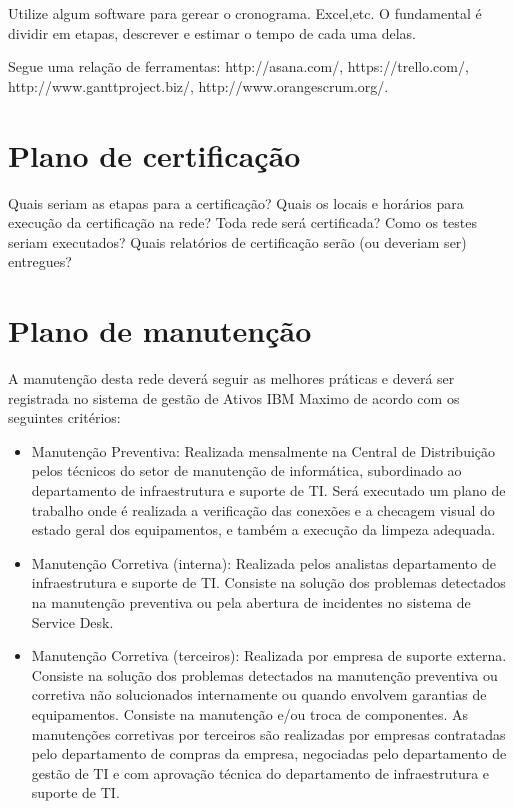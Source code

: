 \documentclass[	DIV=calc,%
							paper=a4,%
							fontsize=12pt,%
							onecolumn]{scrartcl}	 					%
\begin{document}
Utilize algum software para gerear o cronograma. Excel,etc. O fundamental é dividir em etapas, descrever e estimar o tempo de cada uma delas.

Segue uma relação de ferramentas:
http://asana.com/, 
https://trello.com/, 
http://www.ganttproject.biz/, 
http://www.orangescrum.org/. 

\section{Plano de certificação}
Quais seriam as etapas para a certificação? 
Quais os locais e horários para execução da certificação na rede? Toda rede será certificada?
Como os testes seriam executados?
Quais relatórios de certificação serão (ou deveriam ser) entregues? 

\section{Plano de manutenção}

A manutenção desta rede deverá seguir as melhores práticas e deverá ser registrada no sistema de gestão de Ativos IBM Maximo de acordo com os seguintes critérios: 
\begin{itemize}
	\item Manutenção Preventiva: Realizada mensalmente na Central de Distribuição pelos técnicos do setor de manutenção de informática, subordinado ao departamento de infraestrutura e suporte de TI. Será executado um plano de trabalho onde é realizada a verificação das conexões e a checagem visual do estado geral dos equipamentos, e também a execução da limpeza adequada. 
	\item Manutenção Corretiva (interna): Realizada pelos analistas departamento de infraestrutura e suporte de TI. Consiste na solução dos problemas detectados na manutenção preventiva ou pela abertura de incidentes no sistema de Service Desk.
	\item Manutenção Corretiva (terceiros): Realizada por empresa de suporte externa. Consiste na solução dos problemas detectados na manutenção preventiva ou corretiva não solucionados internamente ou quando envolvem garantias de equipamentos. Consiste na manutenção e/ou troca de componentes. As manutenções corretivas por terceiros são realizadas por empresas contratadas pelo departamento de compras da empresa, negociadas pelo departamento de gestão de TI e com aprovação técnica do departamento de infraestrutura e suporte de TI.
\end{itemize}
\end{document}
